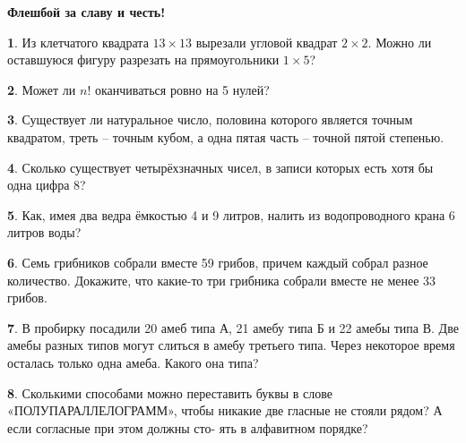 \documentclass[b5paper,usehyperref, twoside]{article}
\theoremstyle{definition}
\theoremstyle{definition}
\newtheorem{Task}{}
\begin{document}
\large
	

\begin{center}
\textbf{Флешбой за славу и честь!}
\end{center}


\begin{Task}
	Из клетчатого квадрата $13 \times 13$ вырезали угловой квадрат $2 \times 2$. Можно ли оставшуюся фигуру разрезать на прямоугольники $1 \times 5$?
\end{Task}

\begin{Task}
	Может ли $n!$ оканчиваться ровно на 5 нулей?
\end{Task}

\begin{Task}
	Существует ли натуральное число, половина которого является точным квадратом, треть – точным кубом, а одна пятая часть – точной пятой степенью.
\end{Task}

\begin{Task}
	Сколько существует четырёхзначных чисел, в записи которых есть хотя бы одна цифра 8?
\end{Task}

\begin{Task}
	Как, имея два ведра ёмкостью 4 и 9 литров, налить из водопроводного крана 6
	литров воды?
\end{Task}

\begin{Task}
	Семь грибников собрали вместе 59 грибов, причем каждый собрал разное количество. Докажите, что какие-то три грибника собрали вместе не менее 33 грибов.
\end{Task}

\begin{Task}
	В пробирку посадили 20 амеб типа А, 21 амебу типа Б и 22 амебы типа В. Две амебы разных типов могут слиться в амебу третьего типа. Через некоторое время осталась только одна амеба. Какого она типа?
\end{Task}


\begin{Task}
	Сколькими способами можно переставить буквы в слове «ПОЛУПАРАЛЛЕЛОГРАММ», чтобы никакие две гласные не стояли рядом? А если согласные при этом должны сто- ять в алфавитном порядке?
\end{Task}
\end{document}
